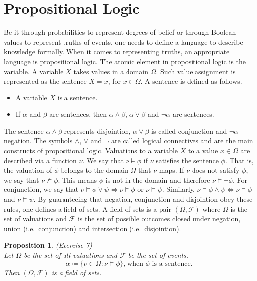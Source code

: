 \documentclass{amsart}
\theoremstyle{plain}
\newtheorem{proposition}{Proposition}
\begin{document}
\section{Propositional Logic}

Be it through probabilities to represent degrees of belief or through Boolean values to represent
truths of events, one needs to define a language to describe knowledge formally. When it comes to
representing truths, an appropriate language is propositional logic. The atomic element in
propositional logic is the variable. A variable $X$ takes values in a domain $\Omega$. Such value
assignment is represented as the sentence $X=x$, for $x\in \Omega$. A sentence is defined as
follows.

\begin{itemize}
  \item A variable $X$ is a sentence.
  \item If $\alpha$ and $\beta$ are sentences, then $\alpha \wedge \beta$, $\alpha \vee \beta$ and
    $\neg \alpha$ are sentences.
\end{itemize}

The sentence $\alpha \wedge \beta$ represents disjointion, $\alpha \vee \beta$ is called
conjunction and $\neg \alpha$ negation. The symbols $\wedge$, $\vee$ and $\neg$ are called logical
connectives and are the main constructs of propositional logic. Valuations to a variable $X$ to a
value $x\in \Omega$ are described via a function $\nu$. We say that $\nu \models \phi$ if $\nu$
satisfies the sentence $\phi$. That is, the valuation of $\phi$ belongs to the domain $\Omega$ that
$\nu$ maps. If $\nu$ does not satisfy $\phi$, we say that $\nu \not\models \phi$. This means $\phi$
is not in the domain and therefore $\nu \models \neg \phi$. For conjunction, we say that $\nu
\models \phi \vee \psi \iff \nu \models \phi$ or $\nu \models \psi$. Similarly, $\nu \models \phi
\wedge \psi \iff \nu \models \phi$ and $\nu \models \psi$. By guaranteeing that negation,
conjunction and disjointion obey these rules, one defines a field of sets. A field of sets is a
pair $(\Omega,\mathcal{F})$ where $\Omega$ is the set of valuations and $\mathcal{F}$ is the set
of possible outcomes closed under negation, union (i.e.\ conjunction) and intersection (i.e.\
disjointion).

\begin{proposition} (Exercise 7)\\
  Let $\Omega$ be the set of all valuations and $\mathcal{F}$ be the set of events.
  \begin{equation*}
    \alpha \coloneqq \{\nu \in \Omega : \nu \models \phi\}\text{, when $\phi$ is a sentence.}
  \end{equation*}
  Then $(\Omega,\mathcal{F})$ is a field of sets.
\end{proposition}
\end{document}
